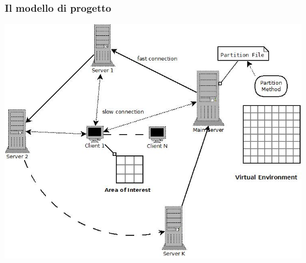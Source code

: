 \begin{frame}
\frametitle{Il modello di progetto}
\begin{center}
\includegraphics[scale=.45]{schemaRing.jpeg}
\end{center}
\end{frame}
